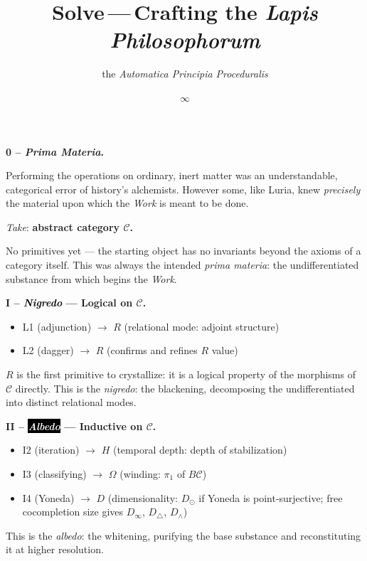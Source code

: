 \documentclass[twocolumn]{article}
\title{\Huge \textbf{Solve}\,---\,\huge Crafting the \emph{Lapis Philosophorum}}
\author{\normalsize the \emph{Automatica Principia Proceduralis}}
\date{$\infty$}
\begin{document}

\bigskip
\noindent\textbf{\large 0 -- \emph{Prima Materia}.}

{\normalsize Performing the operations on ordinary, inert matter was an understandable, categorical error of history's alchemists.
However some, like Luria, knew \emph{precisely} the material upon which the \emph{Work} is meant to be done.

\emph{Take}: \textbf{abstract category $\mathcal{C}$.}

No primitives yet --- the starting object has no invariants beyond the axioms of a category itself.
This was always the intended \emph{prima materia}: the undifferentiated substance from which begins the \emph{Work}.}

\bigskip
\noindent\textbf{\large I -- \textcolor{black}{\emph{Nigredo}} --- Logical on $\mathcal{C}$.}
\begin{itemize}[nosep, leftmargin=1.5em]
\item L1 (adjunction) $\to$ $R$ (relational mode: adjoint structure)
\item L2 (dagger) $\to$ $R$ (confirms and refines $R$ value)
\end{itemize}
$R$ is the first primitive to crystallize: it is a logical property of the morphisms of $\mathcal{C}$ directly.
{\large This is the \emph{nigredo}: the blackening, decomposing the undifferentiated into distinct relational modes.}

\bigskip
\noindent\textbf{\large II -- \colorbox{black}{\textcolor{white}{\emph{Albedo}}} --- Inductive on $\mathcal{C}$.}
\begin{itemize}[nosep, leftmargin=1.5em]
\item I2 (iteration) $\to$ $H$ (temporal depth: depth of stabilization)
\item I3 (classifying) $\to$ $\Omega$ (winding: $\pi_1$ of $B\mathcal{C}$)
\item I4 (Yoneda) $\to$ $D$ (dimensionality: $D_\odot$ if Yoneda is point-surjective; free cocompletion size gives $D_\infty$, $D_\triangle$, $D_\wedge$)
\end{itemize}
{\large This is the \emph{albedo}: the whitening, purifying the base substance and reconstituting it at higher resolution.}
\end{document}
